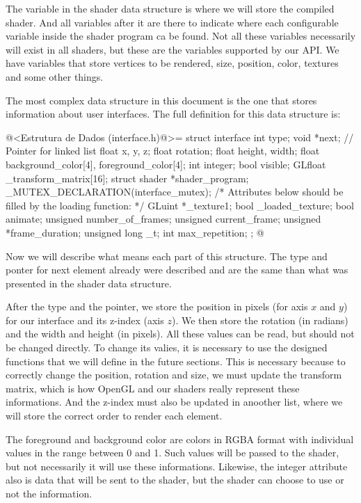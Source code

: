The variable  in the shader data structure is
where we will store the compiled shader. And all variables after it
are there to indicate where each configurable variable inside the
shader program ca be found. Not all these variables necessarily will
exist in all shaders, but these are the variables supported by our
API. We have variables that store vertices to be rendered, size,
position, color, textures and some other things.


The most complex data structure in this document is the one that
stores information about user interfaces. The full definition for this
data structure is:

\iniciocodigo
@<Estrutura de Dados (interface.h)@>=
struct interface{
  int type;
  void *next; // Pointer for linked list
  float x, y, z;
  float rotation;
  float height, width;
  float background_color[4], foreground_color[4];
  int integer;
  bool visible;
  GLfloat _transform_matrix[16];
  struct shader *shader_program;
  _MUTEX_DECLARATION(interface_mutex);
  /* Attributes below should be filled by the loading function: */
  GLuint *_texture1;
  bool _loaded_texture;
  bool animate;
  unsigned number_of_frames;
  unsigned current_frame;
  unsigned *frame_duration;
  unsigned long _t;
  int max_repetition;
};
@
\fimcodigo

Now we will describe what means each part of this structure. The type
and ponter for next element already were described and are the same
than what was presented in the shader data structure.

After the type and the pointer, we store the position in pixels (for
axis $x$ and $y$) for our interface and its z-index (axis $z$). We
then store the rotation (in radians) and the width and height (in
pixels). All these values can be read, but should not be changed
directly. To change its valies, it is necessary to use the designed
functions that we will define in the future sections. This is
necessary because to correctly change the position, rotation and size,
we must update the transform matrix, which is how OpenGL and our
shaders really represent these informations. And the z-index must also
be updated in anoother list, where we will store the correct order to
render each element.

The foreground and background color are colors in RGBA format with
individual values in the range between 0 and 1. Such values will be
passed to the shader, but not necessarily it will use these
informations. Likewise, the integer attribute also is data that will
be sent to the shader, but the shader can choose to use or not the
information.

